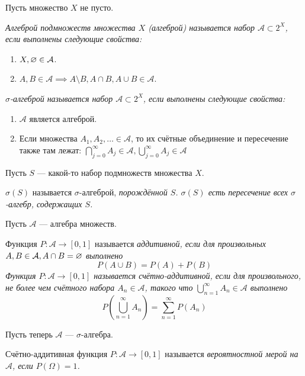Пусть множество $X$ не пусто.
\begin{definition}
    \it{Алгеброй подмножеств множества $X$} (алгеброй) называется набор $\mathcal{A} \subset 2^X$, если выполнены следующие свойства:
    \begin{enumerate}
        \item $X, \varnothing \in \mathcal{A}$.
        \item $A, B \in \mathcal{A} \implies A \setminus B, A \cap B, A \cup B \in \mathcal{A}$.
    \end{enumerate}
\end{definition}
\begin{definition}
    \it{$\sigma$-алгеброй} называется набор $\mathcal{A} \subset 2^X$, если выполнены следующие свойства:
    \begin{enumerate}
        \item $\mathcal{A}$ является алгеброй.
        \item Если множества $A_1, A_2, \ldots \in \mathcal{A}$, то их счётные объединение и пересечение также
        там лежат: $\bigcap_{j = 0}^{\infty} A_j \in \mathcal{A}, \bigcup_{j = 0}^{\infty} A_j \in \mathcal{A}$
    \end{enumerate}
\end{definition}
Пусть $S$ --- какой-то набор подмножеств множества $X$.
\begin{definition}
    $\sigma(S)$ называется $\sigma$-алгеброй, \it{порождённой} $S$. $\sigma(S)$ есть пересечение всех
    $\sigma$-алгебр, содержащих $S$.
\end{definition}
Пусть $\mathcal{A}$ --- алгебра множеств.
\begin{definition}
    Функция $P \colon \mathcal{A} \to [0, 1]$ называется \it{аддитивной}, если для произвольных $A, B \in \mathcal{A},
    A \cap B = \varnothing$ выполнено
    \[
        P(A \cup B) = P(A) + P(B)
    \]
    Функция $P \colon \mathcal{A} \to [0, 1]$ называется \it{счётно-аддитивной}, если для произвольного, не более чем
    счётного набора $A_n \in \mathcal{A}$, такого что $\bigcup_{n = 1}^{\infty} A_n \in  \mathcal{A}$ выполнено
    \[
        P \left( \bigcup_{n = 1}^{\infty} A_n \right) = \sum\limits_{n=1}^{\infty} P(A_n)
    \]
\end{definition}
Пусть теперь $\mathcal{A}$ --- $\sigma$-алгебра.
\begin{definition}
    Счётно-аддитивная функция $P \colon \mathcal{A} \to [0, 1]$ называется \it{вероятностной мерой} на $\mathcal{A}$,
    если $P(\Omega) = 1$.
\end{definition}
